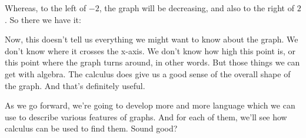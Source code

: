 \documentclass[pdftex, brazil, 12pt, twoside]{article}
\begin{document}
Whereas, to the left of $-2$, the graph will be decreasing,
and also to the right of $2$. So there we have it:

\begin{figure}[H]
  \begin{center}
  \end{center}
\end{figure}

Now, this doesn't tell us everything
we might want to know about the graph.
We don't know where it crosses the x-axis.
We don't know how high this point is,
or this point where the graph turns around, in other words.
But those things we can get with algebra.
The calculus does give us a good sense of the overall shape
of the graph.
And that's definitely useful.

As we go forward, we're going to develop more and more language
which we can use to describe various features of graphs.
And for each of them, we'll see how calculus
can be used to find them.
Sound good?








\end{document}
